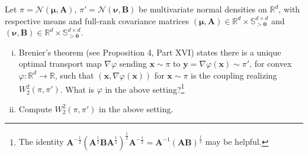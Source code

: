 Let $\pi = \mathcal{N}(\boldsymbol{\mu}, \mathbf{A})$, $\pi' = \mathcal{N}(\boldsymbol{\nu}, \mathbf{B})$ be multivariate normal densities on $\mathbb{R}^d$, with respective means and full-rank covariance matrices $(\boldsymbol{\mu}, \mathbf{A}) \in \mathbb{R}^d \times \mathbb{S}_{>\mathbf{0}}^{d \times d}$ and $(\boldsymbol{\nu}, \mathbf{B}) \in \mathbb{R}^d \times \mathbb{S}_{>\mathbf{0}}^{d \times d}$.

\begin{enumerate}[(i)]
    \item Brenier's theorem (see Proposition 4, Part XVI) states there is a unique optimal transport map $\nabla \varphi$ sending $\mathbf{x} \sim \pi$ to $\mathbf{y} = \nabla \varphi(\mathbf{x}) \sim \pi'$, for convex $\varphi : \mathbb{R}^d \to \mathbb{R}$, such that $(\mathbf{x}, \nabla \varphi(\mathbf{x}))$ for $\mathbf{x} \sim \pi$ is the coupling realizing $W_2^2(\pi, \pi')$. What is $\varphi$ in the above setting?\footnote{The identity $\mathbf{A}^{-\frac{1}{2}}(\mathbf{A}^{\frac{1}{2}} \mathbf{B} \mathbf{A}^{\frac{1}{2}})^{\frac{1}{2}} \mathbf{A}^{-\frac{1}{2}} = \mathbf{A}^{-1}(\mathbf{A}\mathbf{B})^{\frac{1}{2}}$ may be helpful.}

    \item Compute $W_2^2(\pi, \pi')$ in the above setting.
\end{enumerate}
